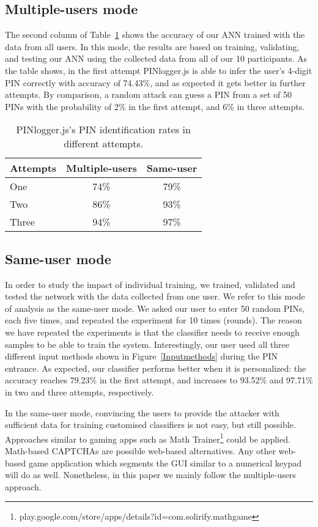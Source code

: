 \documentclass[10pt,twocolumn]{article}
\begin{document}
\subsection{Multiple-users mode}
\label{rate}
The second column of Table~\ref{allusers} shows the accuracy of our ANN  trained with the data from all users. In this mode, 
the results are based on training, validating, and testing our ANN using the collected data from all of our 10 participants. 
As the table shows, in the first attempt PINlogger.js is able to infer the user's 4-digit PIN correctly with accuracy of 74.43\%, and as expected it gets better in further attempts.  
By comparison, a random attack can guess a PIN from a set of 50 PINs with the probability of 2\% in the first attempt, and 6\% in three attempts.

\begin{table}[t]
\centering
\begin{tabular}{|l|c|c|}
\hline
Attempts  
& Multiple-users & Same-user \\
\hline
One & 74\% &79\%  \\
Two &  86\% &93\% \\
Three & 94\% &97\% \\
\hline
\end{tabular}
\caption {PINlogger.js's PIN identification rates in different attempts.}
\label{allusers}
\end{table}


\subsection{Same-user mode}
\label{ind}
In order to study the impact of individual training, 
we trained, validated and tested the network with the data collected from one user. 
We refer to this mode of analysis as the same-user mode. 
We asked our user to enter 50 random PINs, each five times, and repeated the experiment for 10 times (rounds). 
The reason we have repeated the experiments is that the classifier needs to receive enough samples to be able to train the system. 
Interestingly, our user used all three different input methods shown in Figure~\ref{Inputmethods} during the PIN entrance. 
As expected, our classifier performs better when it is personalized: the accuracy reaches 79.23\% in the first attempt, and increases to 93.52\% and 97.71\% in two and three attempts, respectively.  

In the same-user mode, convincing the users to provide the attacker with sufficient data for training customised classifiers is not easy, but still possible. Approaches similar to gaming apps such as Math Trainer\footnote{play.google.com/store/apps/details?id=com.solirify.mathgame} could be applied. Math-based CAPTCHAs are possible web-based alternatives.  
Any other web-based game application which segments the GUI similar to a numerical keypad will do as well. Nonetheless, in this paper we mainly follow the multiple-users approach. 
\end{document}
